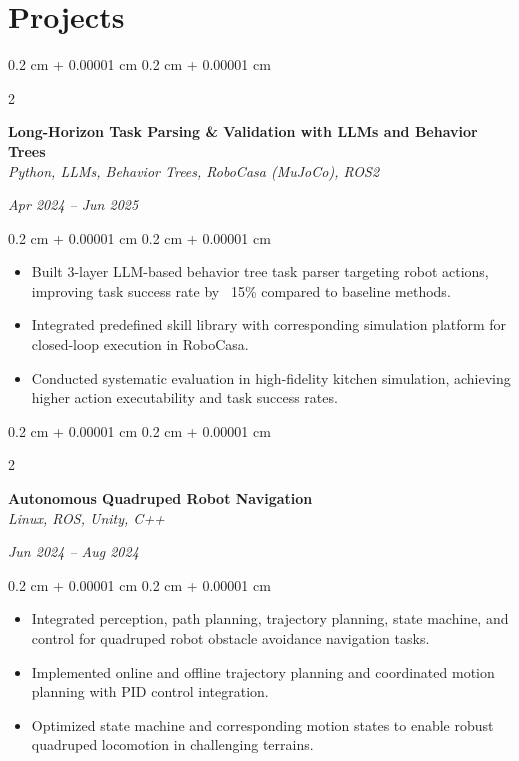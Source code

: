 \documentclass[10pt, letterpaper]{article}
\newenvironment{highlights}{
    \begin{itemize}[
        topsep=0.10 cm,
        parsep=0.10 cm,
        partopsep=0pt,
        itemsep=0pt,
        leftmargin=0.4 cm + 10pt
    ]
}{
    \end{itemize}
}
\newenvironment{onecolentry}{
    \begin{adjustwidth}{
        0.2 cm + 0.00001 cm
    }{
        0.2 cm + 0.00001 cm
    }
}{
    \end{adjustwidth}
}
\newenvironment{twocolentry}[2][]{
    \onecolentry
    \def\secondColumn{#2}
    \setcolumnwidth{\fill, 4.5 cm}
    \begin{paracol}{2}
}{
    \switchcolumn \raggedleft \secondColumn
    \end{paracol}
    \endonecolentry
}
\begin{document}
    \vspace{0.3 cm}

    \section{Projects}

    \begin{twocolentry}{\textit{Apr 2024 -- Jun 2025}}
        \textbf{Long-Horizon Task Parsing \& Validation with LLMs and Behavior Trees} \\
        \textit{Python, LLMs, Behavior Trees, RoboCasa (MuJoCo), ROS2}
    \end{twocolentry}

    \vspace{0.10 cm}
    \begin{onecolentry}
        \begin{highlights}
            \item Built 3-layer LLM-based behavior tree task parser targeting robot actions, improving task success rate by ~15\% compared to baseline methods.
            \item Integrated predefined skill library with corresponding simulation platform for closed-loop execution in RoboCasa.
            \item Conducted systematic evaluation in high-fidelity kitchen simulation, achieving higher action executability and task success rates.
        \end{highlights}
    \end{onecolentry}

    \vspace{0.2 cm}

    \begin{twocolentry}{\textit{Jun 2024 -- Aug 2024}}
        \textbf{Autonomous Quadruped Robot Navigation} \\
        \textit{Linux, ROS, Unity, C++}
    \end{twocolentry}

    \vspace{0.10 cm}
    \begin{onecolentry}
        \begin{highlights}
            \item Integrated perception, path planning, trajectory planning, state machine, and control for quadruped robot obstacle avoidance navigation tasks.
            \item Implemented online and offline trajectory planning and coordinated motion planning with PID control integration.
            \item Optimized state machine and corresponding motion states to enable robust quadruped locomotion in challenging terrains.
        \end{highlights}
    \end{onecolentry}
\end{document}
